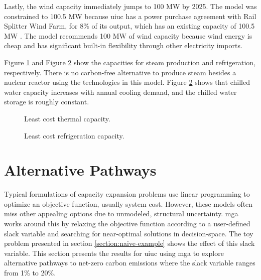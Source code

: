 Lastly, the wind capacity immediately jumps to 100 MW by 2025. The model was
constrained to 100.5 MW because \gls{uiuc} has a power purchase agreement with
Rail Splitter Wind Farm, for 8\% of its output, which has an existing capacity of
100.5 MW  \cite{breitweiser_wind_2016}. The model recommends 100 MW of wind
capacity because wind energy is cheap and has significant built-in flexibility
through other electricity imports.

Figure \ref{fig:uiuc_thm_cap} and Figure \ref{fig:uiuc_chw_cap} show the capacities
for steam production and refrigeration, respectively. There is no carbon-free
alternative to produce steam besides a nuclear reactor using the technologies
in this model. Figure
\ref{fig:uiuc_chw_cap} shows that chilled water capacity increases with annual
cooling demand, and the chilled water storage is roughly constant.

\begin{figure}[H]
    \centering
    \resizebox{0.55\columnwidth}{!}{}
    \caption{Least cost thermal capacity.}
    \label{fig:uiuc_thm_cap}
\end{figure}


\begin{figure}[H]
    \centering
    \resizebox{0.55\columnwidth}{!}{}
    \caption{Least cost refrigeration capacity.}
    \label{fig:uiuc_chw_cap}
\end{figure}



\section{Alternative Pathways}

Typical formulations of capacity expansion problems use linear programming to optimize
an objective function, usually system cost. However, these models often miss
other appealing options due to unmodeled, structural uncertainty. \gls{mga}
works around this by relaxing the objective function according to a user-defined
slack variable and searching for near-optimal solutions in decision-space.
The toy problem presented in section \ref{section:naive-example} shows the effect
of this slack variable.
This section presents the results for \gls{uiuc} using \gls{mga} to explore
alternative pathways to net-zero carbon emissions where the slack variable ranges
from 1\% to 20\%.

